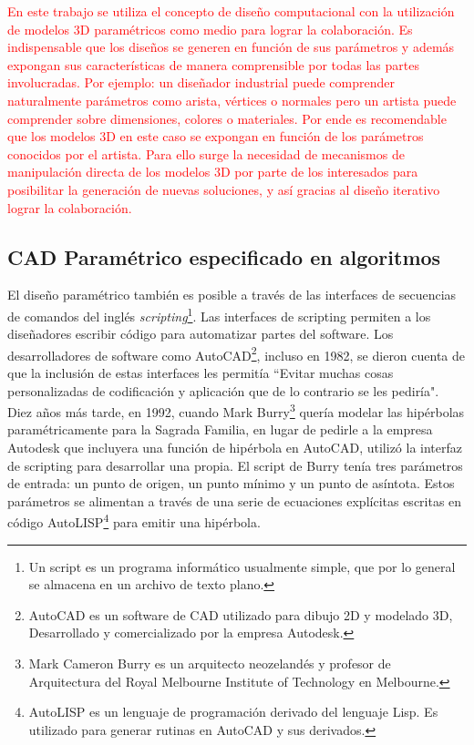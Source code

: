 \textcolor{red}{
En este trabajo se utiliza el concepto de diseño computacional con la utilización de modelos 3D paramétricos como medio para lograr la colaboración. Es indispensable que los diseños se generen en función de sus parámetros y además expongan sus características de manera comprensible por todas las partes involucradas. Por ejemplo: un diseñador industrial puede comprender naturalmente parámetros como arista, vértices o normales pero un artista puede comprender sobre dimensiones, colores o materiales. Por ende es recomendable que los modelos 3D en este caso se expongan en función de los parámetros conocidos por el artista.
Para ello surge la necesidad de mecanismos de manipulación directa de los modelos 3D por parte de los interesados para posibilitar la generación de nuevas soluciones, y así gracias al diseño iterativo lograr la colaboración.}



\subsection{CAD Paramétrico especificado en algoritmos} 
El diseño paramétrico también es posible a través de las interfaces de secuencias de comandos del inglés \textit{scripting}\footnote{Un script es un programa informático usualmente simple, que por lo general se almacena en un archivo de texto plano. }. Las interfaces de scripting permiten a los diseñadores escribir código para automatizar partes del software. Los desarrolladores de software como AutoCAD\footnote{AutoCAD es un software de CAD utilizado para dibujo 2D y modelado 3D, Desarrollado y comercializado por la empresa Autodesk.}, incluso en 1982, se dieron cuenta de que la inclusión de estas interfaces les permitía ``Evitar muchas cosas personalizadas de codificación y aplicación que de lo contrario se les pediría". Diez años más tarde, en 1992, cuando Mark Burry\footnote{Mark Cameron Burry es un arquitecto neozelandés y profesor de Arquitectura del Royal Melbourne Institute of Technology en Melbourne.} quería modelar las hipérbolas paramétricamente para la Sagrada Familia, en lugar de pedirle a la empresa Autodesk que incluyera una función de hipérbola en AutoCAD, utilizó la interfaz de scripting para desarrollar una propia. El script de Burry tenía tres parámetros de entrada: un punto de origen, un punto mínimo y un punto de asíntota. Estos parámetros se alimentan a través de una serie de ecuaciones explícitas escritas en código AutoLISP\footnote{AutoLISP es un lenguaje de programación derivado del lenguaje Lisp. Es utilizado para generar rutinas en AutoCAD y sus derivados.} para emitir una hipérbola. 


